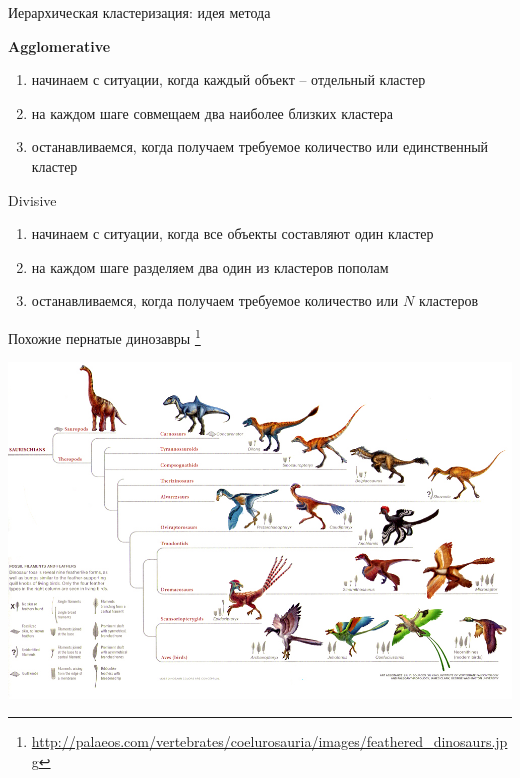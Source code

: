 \documentclass[aspectratio=169]{beamer}
\begin{document}
\begin{frame}{Иерархическая кластеризация: идея метода}

{\bf Agglomerative}
\begin{enumerate}
\item начинаем с ситуации, когда каждый объект -- отдельный кластер
\item на каждом шаге совмещаем два наиболее близких кластера
\item останавливаемся, когда получаем требуемое количество или единственный кластер
\end{enumerate}

\vspace{1em}
Divisive
\begin{enumerate}
\item начинаем с ситуации, когда все объекты составляют один кластер
\item на каждом шаге разделяем два один из кластеров пополам
\item останавливаемся, когда получаем требуемое количество или $N$ кластеров
\end{enumerate}

\end{frame}

\begin{frame}{Похожие пернатые динозавры \footnote{\url{http://palaeos.com/vertebrates/coelurosauria/images/feathered_dinosaurs.jpg}}}

\begin{center}
\includegraphics[height=0.8\textheight]{images/dinosaurs.jpg}
\end{center}

\end{frame}
\end{document}
